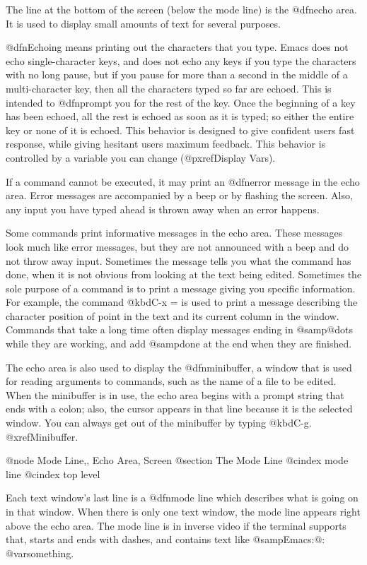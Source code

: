   The line at the bottom of the screen (below the mode line) is the
@dfn{echo area}.  It is used to display small amounts of text for several
purposes.

  @dfn{Echoing} means printing out the characters that you type.  Emacs
does not echo single-character keys, and does not echo any keys if you type
the characters with no long pause, but if you pause for more than a second
in the middle of a multi-character key, then all the characters typed so
far are echoed.  This is intended to @dfn{prompt} you for the rest of the
key.  Once the beginning of a key has been echoed, all the rest is echoed
as soon as it is typed; so either the entire key or none of it is echoed.
This behavior is designed to give confident users fast response, while
giving hesitant users maximum feedback.  This behavior is controlled by a
variable you can change (@pxref{Display Vars}).

  If a command cannot be executed, it may print an @dfn{error message} in
the echo area.  Error messages are accompanied by a beep or by flashing the
screen.  Also, any input you have typed ahead is thrown away when an error
happens.

  Some commands print informative messages in the echo area.  These
messages look much like error messages, but they are not announced with a
beep and do not throw away input.  Sometimes the message tells you what the
command has done, when it is not obvious from looking at the text being
edited.  Sometimes the sole purpose of a command is to print a message
giving you specific information.  For example, the command @kbd{C-x =} is
used to print a message describing the character position of point in the
text and its current column in the window.  Commands that take a long time
often display messages ending in @samp{@dots{}} while they are working, and
add @samp{done} at the end when they are finished.

  The echo area is also used to display the @dfn{minibuffer}, a window that
is used for reading arguments to commands, such as the name of a file to be
edited.  When the minibuffer is in use, the echo area begins with a prompt
string that ends with a colon; also, the cursor appears in that line
because it is the selected window.  You can always get out of the
minibuffer by typing @kbd{C-g}.  @xref{Minibuffer}.

@node Mode Line,, Echo Area, Screen
@section The Mode Line
@cindex mode line
@cindex top level

  Each text window's last line is a @dfn{mode line} which describes what is
going on in that window.  When there is only one text window, the mode line
appears right above the echo area.  The mode line is in inverse video if
the terminal supports that, starts and ends with dashes, and contains text
like @samp{Emacs:@: @var{something}}.

